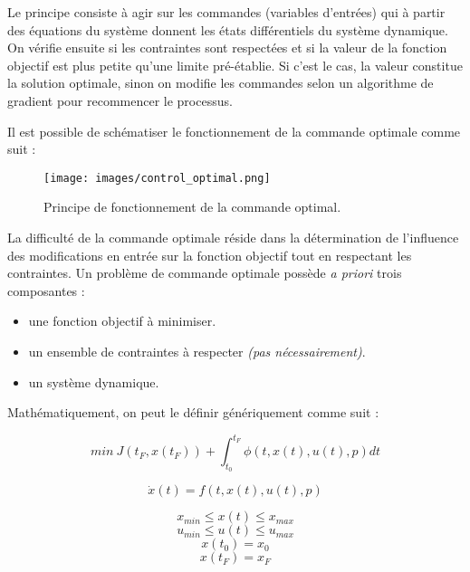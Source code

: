 Le principe consiste à agir sur les commandes (variables d’entrées) qui à partir des équations du système donnent les états différentiels du système dynamique. On vérifie ensuite si les contraintes sont respectées et si la valeur de la fonction objectif est plus petite qu’une limite pré-établie. Si c’est le cas, la valeur constitue la solution optimale, sinon on modifie les commandes selon un algorithme de gradient pour recommencer le processus.

Il est possible de schématiser le fonctionnement de la commande optimale comme suit :

\begin{figure}[H]
\begin{center}
\texttt{[image: images/control\_optimal.png]}
\caption{Principe de fonctionnement de la commande optimal.}
\end{center}
\end{figure}

La difficulté de la commande optimale réside dans la détermination de l’influence des modifications en entrée sur la fonction objectif tout en respectant les contraintes.
Un problème de commande optimale possède \emph{a priori} trois composantes :
\begin{itemize}
\setlength\itemsep{-0.5em}
\item une fonction objectif à minimiser.
\item un ensemble de contraintes à respecter \emph{(pas nécessairement)}.
\item un système dynamique.
\end{itemize}


Mathématiquement, on peut le définir génériquement comme suit :

\begin{description}
\setlength\itemsep{-0.5em}
\item[Fonction objectif :] \[min\ J(t_{F} , x(t_{F})) + \int_{t_{0}}^{t_{F}} { \phi (t, x(t), u(t), p)dt} \]
\item[Contraintes dynamique :] \[\dot{x}(t) = f (t , x(t), u(t), p) \]
\item[Contraintes de bornes :] \[x_{min} \leq x(t) \leq x_{max} \]  \[u_{min} \leq u(t) \leq u_{max} \] \[x(t_{0}) = x_{0}\] \[x(t_{F}) = x_{F}\]
\end{description}

